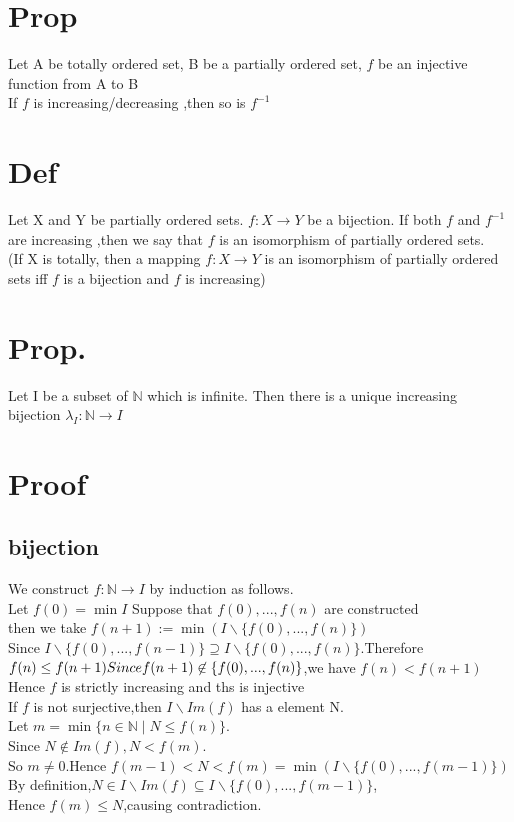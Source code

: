\documentclass{book}
\begin{document}
\section{Prop}

Let A be totally ordered set, B be a partially ordered set, $f$ be an injective function from A to B\\
If $f$ is increasing/decreasing ,then so is $f^{-1}$
\section{Def}
Let X and Y be partially ordered sets. $f:X\rightarrow Y$ be a bijection. If both $f$ and $f^{-1}$ are increasing ,then we say that $f$ is an isomorphism of partially ordered sets.\\
\indent(If X is totally, then a mapping $f:X\rightarrow Y$ is an isomorphism of partially ordered sets iff $f$ is a bijection and $f$ is increasing)
\section{Prop.}
Let I be a subset of $\mathbb{N} $ which is infinite. Then there is a unique increasing bijection $\lambda_I:\mathbb{N} \rightarrow I$
\section{Proof}
\subsection{bijection}
We construct $f:\mathbb{N} \rightarrow I$ by induction as follows.\\
Let $f(0)=\min I$ Suppose that $f(0),...,f(n)$ are constructed\\
then we take $f(n+1):=\min(I\backslash\{f(0),...,f(n)\})$\\
Since $I\backslash\{f(0),...,f(n-1)\}\supseteq I\backslash\{f(0),...,f(n)\}.$Therefore $f(n)\leq f(n+1)\\
Since f(n+1)\not\in\{f(0),...,f(n)\}$,we have $f(n)<f(n+1)$\\
Hence $f$ is strictly increasing and ths is injective\\
If $f$ is not surjective,then $I\backslash Im(f)$ has a element N. \\
Let $m=\min\{n\in\mathbb{N} \mid N\leq f(n)\}$.\\
Since $N\not\in Im(f),N<f(m)$.\\
So $m\not=0$.Hence $f(m-1)<N<f(m)=\min(I\backslash\{f(0),...,f(m-1)\})$ \\
By definition,$N\in I\backslash Im(f)\subseteq I\backslash \{f(0),...,f(m-1)\}$,\\Hence $f(m)\leq N$,causing contradiction.
\end{document}
